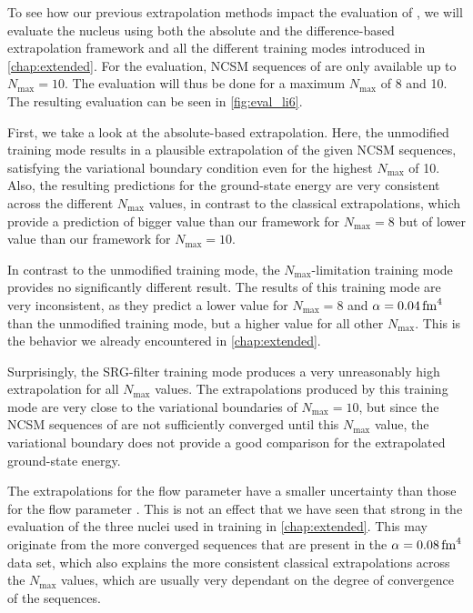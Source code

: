 To see how our previous extrapolation methods impact the evaluation of , we will evaluate the nucleus using both the absolute and the difference-based extrapolation framework and all the different training modes introduced in \autoref{chap:extended}. For the evaluation, NCSM sequences of  are only available up to $N_\mathrm{max} = 10$. The evaluation will thus be done for a maximum $N_\mathrm{max}$ of 8 and 10. The resulting evaluation can be seen in \autoref{fig:eval_li6}.

First, we take a look at the absolute-based extrapolation. Here, the unmodified training mode results in a plausible extrapolation of the given NCSM sequences, satisfying the variational boundary condition even for the highest $N_\mathrm{max}$ of 10. Also, the resulting predictions for the ground-state energy are very consistent across the different $N_\mathrm{max}$ values, in contrast to the classical extrapolations, which provide a prediction of bigger value than our framework for $N_\mathrm{max} = 8$ but of lower value than our framework for $N_\mathrm{max} = 10$.

In contrast to the unmodified training mode, the $N_\mathrm{max}$-limitation training mode provides no significantly different result. The results of this training mode are very inconsistent, as they predict a lower value for $N_\mathrm{max} = 8$ and $\alpha = \srg{0.04}$ than the unmodified training mode, but a higher value for all other $N_\mathrm{max}$. This is the behavior we already encountered in \autoref{chap:extended}.

Surprisingly, the SRG-filter training mode produces a very unreasonably high extrapolation for all $N_\mathrm{max}$ values. The extrapolations produced by this training mode are very close to the variational boundaries of $N_\mathrm{max} = 10$, but since the NCSM sequences of  are not sufficiently converged until this $N_\mathrm{max}$ value, the variational boundary does not provide a good comparison for the extrapolated ground-state energy.

The extrapolations for the flow parameter  have a smaller uncertainty than those for the flow parameter . This is not an effect that we have seen that strong in the evaluation of the three nuclei used in training in \autoref{chap:extended}. This may originate from the more converged sequences that are present in the $\alpha = \srg{0.08}$ data set, which also explains the more consistent classical extrapolations across the $N_\mathrm{max}$ values, which are usually very dependant on the degree of convergence of the sequences.

